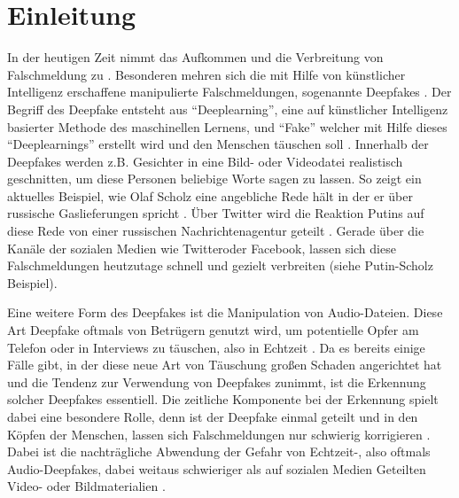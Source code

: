 \section{Einleitung}
In der heutigen Zeit nimmt das Aufkommen und die Verbreitung von Falschmeldung zu \citep[][]{Hancock2021}.
Besonderen mehren sich die mit Hilfe von künstlicher Intelligenz erschaffene manipulierte Falschmeldungen, sogenannte Deepfakes \citep[][]{Shahzad2022}.
Der Begriff des Deepfake entsteht aus ``Deeplearning'', eine auf künstlicher Intelligenz basierter Methode des maschinellen Lernens, und ``Fake'' welcher mit Hilfe dieses ``Deeplearnings'' erstellt wird und den Menschen täuschen soll \citep[][]{Mueller2022}.
Innerhalb der Deepfakes werden z.B. Gesichter in eine Bild- oder Videodatei realistisch geschnitten, um diese Personen beliebige Worte sagen zu lassen.
So zeigt ein aktuelles Beispiel, wie Olaf Scholz eine angebliche Rede hält in der er über russische Gaslieferungen spricht \citep[][]{Klasen2022}.
Über Twitter wird die Reaktion Putins auf diese Rede von einer russischen Nachrichtenagentur geteilt \citep[Vgl.][]{Klasen2022}.
Gerade über die Kanäle der sozialen Medien wie Twitteroder Facebook, lassen sich diese Falschmeldungen heutzutage schnell und gezielt verbreiten (siehe Putin-Scholz Beispiel).
\par
Eine weitere Form des Deepfakes ist die Manipulation von Audio-Dateien.
Diese Art Deepfake oftmals von Betrügern genutzt wird, um potentielle Opfer am Telefon oder in Interviews zu täuschen, also in Echtzeit \citep[][]{Mueller2022}.
Da es bereits einige Fälle gibt, in der diese neue Art von Täuschung großen Schaden angerichtet hat \citep[Vgl.][]{Stupp2019} und die Tendenz zur Verwendung von Deepfakes zunimmt, ist die Erkennung solcher Deepfakes essentiell.
Die zeitliche Komponente bei der Erkennung spielt dabei eine besondere Rolle, denn ist der Deepfake einmal geteilt und in den Köpfen der Menschen, lassen sich Falschmeldungen nur schwierig korrigieren \citep[][]{Hancock2021}.
Dabei ist die nachträgliche Abwendung der Gefahr von Echtzeit-, also oftmals Audio-Deepfakes, dabei weitaus schwieriger als auf sozialen Medien Geteilten Video- oder Bildmaterialien \citep[][]{Shahzad2022}.
\par
